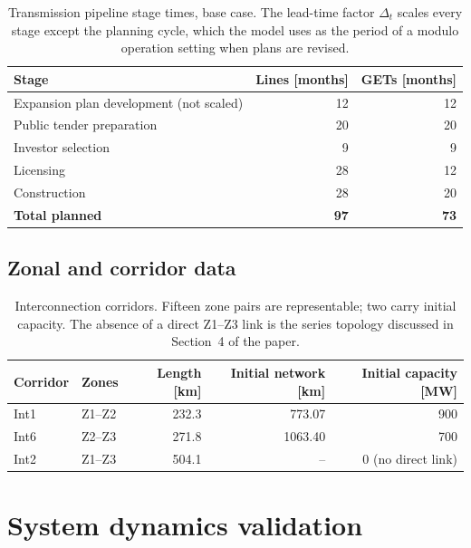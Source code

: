\documentclass[11pt]{article}
\begin{document}
\begin{table}[htb]
  \centering
  \small
  \begin{tabular}{@{}lrr@{}}
    \toprule
    Stage & Lines [months] & GETs [months] \\
    \midrule
    Expansion plan development (not scaled) & 12 & 12 \\
    Public tender preparation & 20 & 20 \\
    Investor selection         &  9 &  9 \\
    Licensing                  & 28 & 12 \\
    Construction               & 28 & 20 \\
    \midrule
    \textbf{Total planned}     & \textbf{97} & \textbf{73} \\
    \bottomrule
  \end{tabular}
  \caption{Transmission pipeline stage times, base case. The lead-time factor
  $\Delta_t$ scales every stage except the planning cycle, which the model uses as
  the period of a modulo operation setting when plans are revised.}
  \label{tab:sm:transstages}
\end{table}

\subsection{Zonal and corridor data}

\begin{table}[htb]
  \centering
  \small
  \begin{tabular}{@{}llrrr@{}}
    \toprule
    Corridor & Zones & Length [\si{\kilo\meter}] & Initial network [\si{\kilo\meter}] & Initial capacity [\si{\mega\watt}] \\
    \midrule
    Int1 & Z1--Z2 & 232.3 & \num{773.07}  & 900 \\
    Int6 & Z2--Z3 & 271.8 & \num{1063.40} & 700 \\
    Int2 & Z1--Z3 & 504.1 & --            & 0 (no direct link) \\
    \bottomrule
  \end{tabular}
  \caption{Interconnection corridors. Fifteen zone pairs are representable; two
  carry initial capacity. The absence of a direct Z1--Z3 link is the series
  topology discussed in Section~4 of the paper.}
  \label{tab:sm:corridors}
\end{table}

\section{System dynamics validation}
\label{sm:validation}
\end{document}
